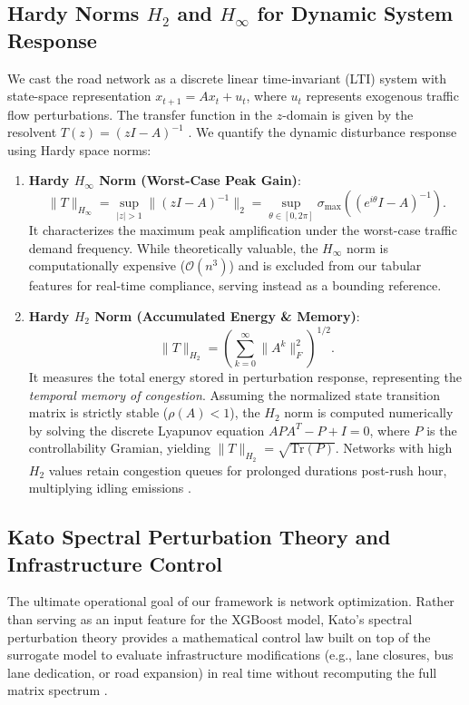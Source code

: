 \documentclass[lettersize,journal]{IEEEtran}
\begin{document}
\subsection{Hardy Norms $H_2$ and $H_\infty$ for Dynamic System Response}
We cast the road network as a discrete linear time-invariant (LTI) system with state-space representation $x_{t+1} = A x_t + u_t$, where $u_t$ represents exogenous traffic flow perturbations. The transfer function in the $z$-domain is given by the resolvent $T(z) = (zI - A)^{-1}$ \cite{Zhou1996}. We quantify the dynamic disturbance response using Hardy space norms:
\begin{enumerate}
    \item \textbf{Hardy $H_\infty$ Norm (Worst-Case Peak Gain)}:
    \begin{equation}
    \|T\|_{H_\infty} = \sup_{|z| > 1} \|(zI - A)^{-1}\|_2 = \sup_{\theta \in [0, 2\pi]} \sigma_{\max}\left( (e^{i\theta}I - A)^{-1} \right).
    \end{equation}
    It characterizes the maximum peak amplification under the worst-case traffic demand frequency. While theoretically valuable, the $H_\infty$ norm is computationally expensive ($\mathcal{O}(n^3)$) and is excluded from our tabular features for real-time compliance, serving instead as a bounding reference.
    \item \textbf{Hardy $H_2$ Norm (Accumulated Energy \& Memory)}:
    \begin{equation}
    \|T\|_{H_2} = \left( \sum_{k=0}^{\infty} \| A^k \|_F^2 \right)^{1/2}.
    \end{equation}
    It measures the total energy stored in perturbation response, representing the \emph{temporal memory of congestion}. Assuming the normalized state transition matrix is strictly stable ($\rho(A) < 1$), the $H_2$ norm is computed numerically by solving the discrete Lyapunov equation $A P A^T - P + I = 0$, where $P$ is the controllability Gramian, yielding $\|T\|_{H_2} = \sqrt{\text{Tr}(P)}$. Networks with high $H_2$ values retain congestion queues for prolonged durations post-rush hour, multiplying idling emissions \cite{Doyle1989}.
\end{enumerate}

\subsection{Kato Spectral Perturbation Theory and Infrastructure Control}
The ultimate operational goal of our framework is network optimization. Rather than serving as an input feature for the XGBoost model, Kato's spectral perturbation theory provides a mathematical control law built on top of the surrogate model to evaluate infrastructure modifications (e.g., lane closures, bus lane dedication, or road expansion) in real time without recomputing the full matrix spectrum \cite{Kato1995}.
\end{document}
